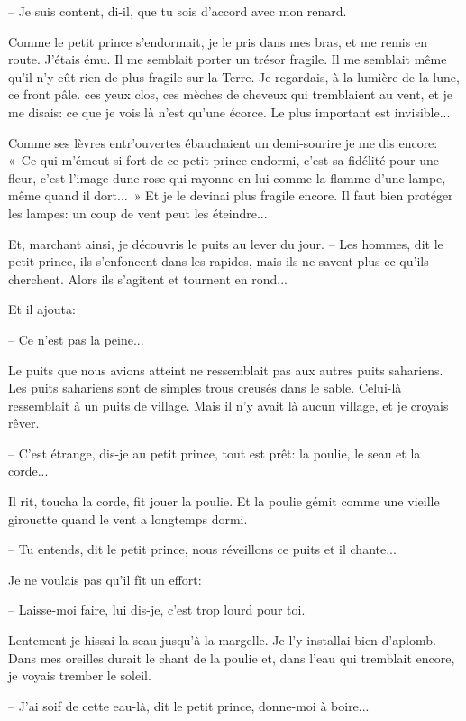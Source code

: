\documentclass[a4paper]{report}
\begin{document}
-- Je suis content, di-il, que tu sois d'accord avec mon renard.

Comme le petit prince s'endormait, je le pris dans mes bras, et me remis en route. J'étais ému. Il me semblait porter un trésor fragile. Il me semblait même qu'il n'y eût rien de plus fragile sur la Terre. Je regardais, à la lumière de la lune, ce front pâle. ces yeux clos, ces mèches de cheveux qui tremblaient au vent, et je me disais: ce que je vois là n'est qu'une écorce. Le plus important est invisible...

Comme ses lèvres entr'ouvertes ébauchaient un demi-sourire je me dis encore: «~Ce qui m'émeut si fort de ce petit prince endormi, c'est sa fidélité pour une fleur, c'est l'image dune rose qui rayonne en lui comme la flamme d'une lampe, même quand il dort...~» Et je le devinai plus fragile encore. Il faut bien protéger les lampes: un coup de vent peut les éteindre...

Et, marchant ainsi, je découvris le puits au lever du jour.
\parachapter{} %
-- Les hommes, dit le petit prince, ils s'enfoncent dans les rapides, mais ils ne savent plus ce qu'ils cherchent. Alors ils s'agitent et tournent en rond...

Et il ajouta:

-- Ce n'est pas la peine...

Le puits que nous avions atteint ne ressemblait pas aux autres puits sahariens. Les puits sahariens sont de simples trous creusés dans le sable. Celui-là ressemblait à un puits de village. Mais il n'y avait là aucun village, et je croyais rêver.


-- C'est étrange, dis-je au petit prince, tout est prêt: la poulie, le seau et la corde...

Il rit, toucha la corde, fit jouer la poulie. Et la poulie gémit comme une vieille girouette quand le vent a longtemps dormi.

-- Tu entends, dit le petit prince, nous réveillons ce puits et il chante...

Je ne voulais pas qu'il fît un effort:

-- Laisse-moi faire, lui dis-je, c'est trop lourd pour toi.

Lentement je hissai la seau jusqu'à la margelle. Je l'y installai bien d'aplomb. Dans mes oreilles durait le chant de la poulie et, dans l'eau qui tremblait encore, je voyais trember le soleil.

-- J'ai soif de cette eau-là, dit le petit prince, donne-moi à boire...
\end{document}
